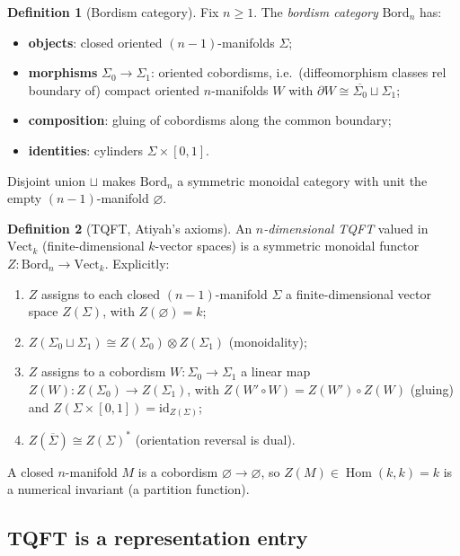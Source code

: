 \documentclass[12pt]{article}
\theoremstyle{definition}
\newtheorem{definition}[definition]{Definition}
\theoremstyle{remark}
\newcommand{\Bord}{\mathrm{Bord}}
\newcommand{\Vect}{\mathrm{Vect}}
\newcommand{\id}{\mathrm{id}}
\newcommand{\Hom}{\operatorname{Hom}}
\begin{document}
\begin{definition}[Bordism category]
\label{def:bord}
Fix $n\ge 1$. The \emph{bordism category} $\Bord_n$ has:
\begin{itemize}
  \item \textbf{objects}: closed oriented $(n-1)$-manifolds $\Sigma$;
  \item \textbf{morphisms} $\Sigma_0\to\Sigma_1$: oriented cobordisms, i.e.\
    (diffeomorphism classes rel boundary of) compact oriented $n$-manifolds $W$
    with $\partial W\cong \overline{\Sigma_0}\sqcup\Sigma_1$;
  \item \textbf{composition}: gluing of cobordisms along the common boundary;
  \item \textbf{identities}: cylinders $\Sigma\times[0,1]$.
\end{itemize}
Disjoint union $\sqcup$ makes $\Bord_n$ a symmetric monoidal category with unit the
empty $(n-1)$-manifold $\varnothing$.
\end{definition}

\begin{definition}[TQFT, Atiyah's axioms]
\label{def:tqft}
An \emph{$n$-dimensional TQFT} valued in $\Vect_k$ (finite-dimensional
$k$-vector spaces) is a symmetric monoidal functor $Z\colon\Bord_n\to\Vect_k$.
Explicitly:
\begin{enumerate}
  \item[(Z1)] $Z$ assigns to each closed $(n-1)$-manifold $\Sigma$ a
    finite-dimensional vector space $Z(\Sigma)$, with $Z(\varnothing)=k$;
  \item[(Z2)] $Z(\Sigma_0\sqcup\Sigma_1)\cong Z(\Sigma_0)\otimes Z(\Sigma_1)$
    (monoidality);
  \item[(Z3)] $Z$ assigns to a cobordism $W\colon\Sigma_0\to\Sigma_1$ a linear map
    $Z(W)\colon Z(\Sigma_0)\to Z(\Sigma_1)$, with
    $Z(W'\circ W)=Z(W')\circ Z(W)$ (gluing) and $Z(\Sigma\times[0,1])=\id_{Z(\Sigma)}$;
  \item[(Z4)] $Z(\overline\Sigma)\cong Z(\Sigma)^*$ (orientation reversal is dual).
\end{enumerate}
A closed $n$-manifold $M$ is a cobordism $\varnothing\to\varnothing$, so
$Z(M)\in\Hom(k,k)=k$ is a numerical invariant (a partition function).
\end{definition}

\subsection{TQFT is a representation entry}
\end{document}
